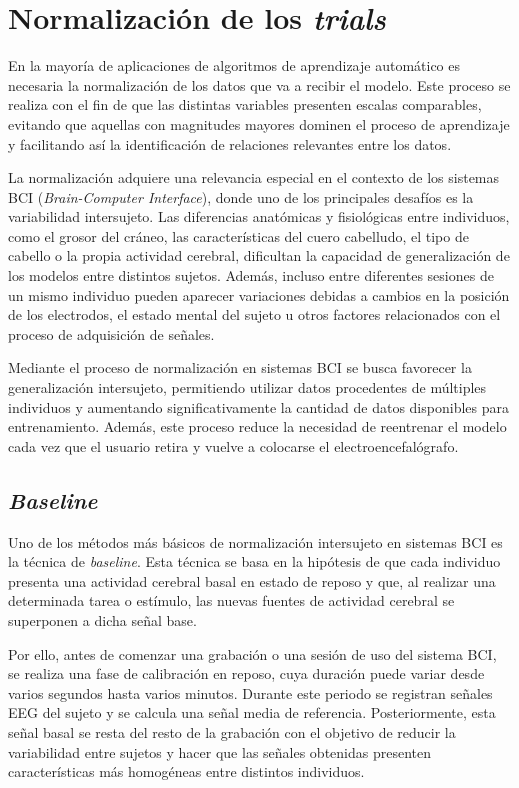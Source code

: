 \section{Normalización de los \textit{trials}}
\label{sec:normalizacion}

En la mayoría de aplicaciones de algoritmos de aprendizaje automático es necesaria la normalización de los datos que va a recibir el modelo. Este proceso se realiza con el fin de que las distintas variables presenten escalas comparables, evitando que aquellas con magnitudes mayores dominen el proceso de aprendizaje y facilitando así la identificación de relaciones relevantes entre los datos.

La normalización adquiere una relevancia especial en el contexto de los sistemas BCI (\textit{Brain-Computer Interface}), donde uno de los principales desafíos es la variabilidad intersujeto. Las diferencias anatómicas y fisiológicas entre individuos, como el grosor del cráneo, las características del cuero cabelludo, el tipo de cabello o la propia actividad cerebral, dificultan la capacidad de generalización de los modelos entre distintos sujetos. Además, incluso entre diferentes sesiones de un mismo individuo pueden aparecer variaciones debidas a cambios en la posición de los electrodos, el estado mental del sujeto u otros factores relacionados con el proceso de adquisición de señales.

Mediante el proceso de normalización en sistemas BCI se busca favorecer la generalización intersujeto, permitiendo utilizar datos procedentes de múltiples individuos y aumentando significativamente la cantidad de datos disponibles para entrenamiento. Además, este proceso reduce la necesidad de reentrenar el modelo cada vez que el usuario retira y vuelve a colocarse el electroencefalógrafo.

\subsection{\textit{Baseline}}
\label{subsec:baseline}

Uno de los métodos más básicos de normalización intersujeto en sistemas BCI es la técnica de \textit{baseline}. Esta técnica se basa en la hipótesis de que cada individuo presenta una actividad cerebral basal en estado de reposo y que, al realizar una determinada tarea o estímulo, las nuevas fuentes de actividad cerebral se superponen a dicha señal base.

Por ello, antes de comenzar una grabación o una sesión de uso del sistema BCI, se realiza una fase de calibración en reposo, cuya duración puede variar desde varios segundos hasta varios minutos. Durante este periodo se registran señales EEG del sujeto y se calcula una señal media de referencia. Posteriormente, esta señal basal se resta del resto de la grabación con el objetivo de reducir la variabilidad entre sujetos y hacer que las señales obtenidas presenten características más homogéneas entre distintos individuos.

